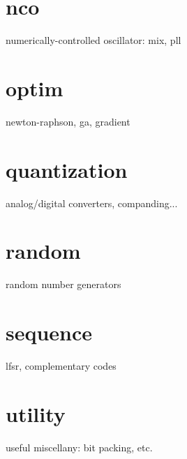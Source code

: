 \documentclass[11pt,twoside]{report}
\begin{document}


\section{nco}
numerically-controlled oscillator: mix, pll
\section{optim}
newton-raphson, ga, gradient
\section{quantization}
analog/digital converters, companding...
\section{random}
random number generators
\section{sequence}
lfsr, complementary codes
\section{utility}
useful miscellany: bit packing, etc. 


%
%
\cleardoublepage
%


\appendix
%
%
\end{document}
